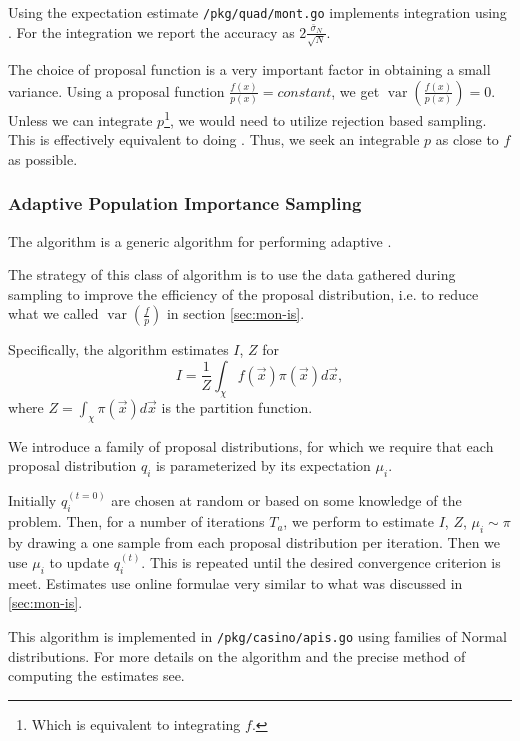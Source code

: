 \documentclass[10pt, a4paper]{article}
\begin{document}
  Using the expectation estimate \texttt{/pkg/quad/mont.go} implements integration using \is{}. For
  the \is{} integration we report the accuracy as $2\frac{\bar\sigma_N}{\sqrt N}$.

  The choice of proposal function is a very important factor in
  obtaining a small variance. Using a proposal function $\frac{f(x)}{p(x)} = constant$, we get
  $\operatorname{var}\left(\frac{f(x)}{p(x)}\right) = 0$. Unless we can integrate $p$\footnote{Which is
  equivalent to integrating $f$.}, we would need to utilize rejection based sampling. This is effectively
  equivalent to doing \is. Thus, we seek an integrable $p$ as close to $f$ as possible.

  \subsubsection{Adaptive Population Importance Sampling}
  The \apis{} algorithm is a generic algorithm for performing adaptive \is{}.

  The strategy of this class of algorithm is to use the data gathered during sampling to improve
  the efficiency of the proposal distribution, i.e. to reduce what we called
  $\operatorname{var}\left(\frac fp\right)$ in section \ref{sec:mon-is}.

  Specifically, the \apis{} algorithm estimates $I$, $Z$ for
  \begin{equation}
  I = \frac{1}{Z} \int_\chi f(\vec{x}) \pi(\vec{x}) d\vec{x},
  \end{equation}
  where $Z = \int_\chi \pi(\vec{x}) d\vec{x}$ is the partition function.

  We introduce a family of proposal distributions, for which we require that each proposal distribution
  $q_i$ is parameterized by its expectation $\mu_i$\cite{apis}\footnotemark.


  Initially $q_i^{(t=0)}$ are chosen at random or based on some knowledge of the problem. Then, for a number
  of iterations $T_a$, we perform \is{} to estimate $I$, $Z$, $\mu_i \sim \pi$ by drawing a one sample from each
  proposal distribution per iteration. Then we use $\mu_i$ to update $q_i^{(t)}$. This is repeated
  until the desired convergence criterion is meet. Estimates use online formulae very similar
  to what was discussed in \ref{sec:mon-is}.

  This algorithm is implemented in \texttt{/pkg/casino/apis.go} using families of Normal distributions.
  For more details on the algorithm and the precise method of computing the estimates see\cite{apis}.
\end{document}
